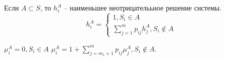 \begin{theorem}
  Если $A \subset S$, то $h_i^A$ -- наименьшее неотрицателььное решение системы.
  \[
    h^A_i = \begin{cases}
      1, S_i \in A \\
      \sum_{j=1}^m p_{ij} h_j^A, S_i \notin A
    \end{cases}
  \]

  $\mu^A_i = 0, S_i \in A$
  $\mu^A_i = 1 + \sum_{j=m_1+1}^{m} p_{ij} \mu_j^A, S_i \notin A$.
\end{theorem}

